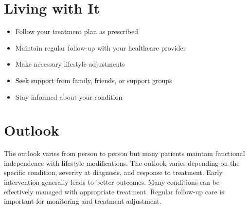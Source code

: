 \section{Living with It}
\begin{itemize}[noitemsep]
  \item Follow your treatment plan as prescribed
  \item Maintain regular follow-up with your healthcare provider
  \item Make necessary lifestyle adjustments
  \item Seek support from family, friends, or support groups
  \item Stay informed about your condition
\end{itemize}
\section{Outlook}
The outlook varies from person to person but many patients maintain functional independence with lifestyle modifications. The outlook varies depending on the specific condition, severity at diagnosis, and response to treatment. Early intervention generally leads to better outcomes. Many conditions can be effectively managed with appropriate treatment. Regular follow-up care is important for monitoring and treatment adjustment.

